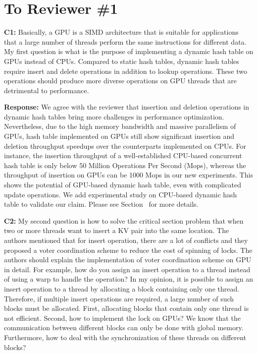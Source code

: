 \section*{To Reviewer \#1}

\begin{shaded}
	\noindent\textbf{C1:} Basically, a GPU is a SIMD architecture that is suitable for applications that a large number of threads perform the same instructions for different data. My first question is what is the purpose of implementing a dynamic hash table on GPUs instead of CPUs. Compared to static hash tables, dynamic hash tables require insert and delete operations in addition to lookup operations. These two operations should produce more diverse operations on GPU threads that are detrimental to performance.
\end{shaded}
%
\noindent\textbf{Response:} 
We agree with the reviewer that insertion and deletion operations in dynamic hash tables bring more 
challenges in performance optimization. Nevertheless, due to the high memory bandwidth and massive parallelism of GPUs, hash table implemented on GPUs still show significant insertion and deletion throughput speedups over the counterparts implemented on CPUs. For instance, the insertion throughput of a well-established CPU-based concurrent hash table \cite{li2014algorithmic} is only below 50 Million Operations Per Second (Mops), whereas the throughput of insertion on GPUs can be 1000 Mops in our new experiments. This shows the potential of GPU-based dynamic hash table, even with complicated update operations. We add experimental study on CPU-based dynamic hash table to validate our claim. Please see Section~ for more details. 

\begin{shaded}
	\noindent\textbf{C2:} My second question is how to solve the critical section problem that when two or more threads want to insert a KV pair into the same location. The authors mentioned that for insert operation, there are a lot of conflicts and they proposed a voter coordination scheme to reduce the cost of spinning of locks. The authors should explain the implementation of voter coordination scheme on GPU in detail. For example, how do you assign an insert operation to a thread instead of using a warp to handle the operation? In my opinion, it is possible to assign an insert operation to a thread by allocating a block containing only one thread. Therefore, if multiple insert operations are required, a large number of such blocks must be allocated. First, allocating blocks that contain only one thread is not efficient. Second, how to implement the lock on GPUs? We know that the communication between different blocks can only be done with global memory. Furthermore, how to deal with the synchronization of these threads on different blocks? 
\end{shaded}

